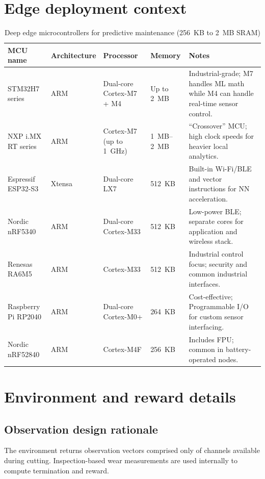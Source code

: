 \documentclass[sn-basic]{sn-jnl} %
\begin{document}
\begin{appendices}

\section{Edge deployment context}
\label{app:edge_context}

\begin{table}[htbp]
	\centering
	\caption{Deep edge microcontrollers for predictive maintenance (256~KB to 2~MB SRAM)}
	\label{tab:deep_edge_mcus}
	\renewcommand{\arraystretch}{1.3}
	\begin{tabular}{@{} l l l l p{5.5cm} @{}}
		\toprule
		\textbf{MCU name} & \textbf{Architecture} & \textbf{Processor} & \textbf{Memory} & \textbf{Notes} \\
		\midrule
		STM32H7 series & ARM & Dual-core Cortex-M7 + M4 & Up to 2~MB & Industrial-grade; M7 handles ML math while M4 can handle real-time sensor control. \\
		NXP i.MX RT series & ARM & Cortex-M7 (up to 1~GHz) & 1~MB--2~MB & ``Crossover'' MCU; high clock speeds for heavier local analytics. \\
		Espressif ESP32-S3 & Xtensa & Dual-core LX7 & 512~KB & Built-in Wi-Fi/BLE and vector instructions for NN acceleration. \\
		Nordic nRF5340 & ARM & Dual-core Cortex-M33 & 512~KB & Low-power BLE; separate cores for application and wireless stack. \\
		Renesas RA6M5 & ARM & Cortex-M33 & 512~KB & Industrial control focus; security and common industrial interfaces. \\
		Raspberry Pi RP2040 & ARM & Dual-core Cortex-M0+ & 264~KB & Cost-effective; Programmable I/O for custom sensor interfacing. \\
		Nordic nRF52840 & ARM & Cortex-M4F & 256~KB & Includes FPU; common in battery-operated nodes. \\
		\bottomrule
	\end{tabular}
\end{table}

\section{Environment and reward details}
\label{app:env_reward}
\subsection{Observation design rationale}
The environment returns observation vectors comprised only of channels available during cutting. Inspection-based wear measurements are used internally to compute termination and reward.


\end{appendices}
\end{document}
